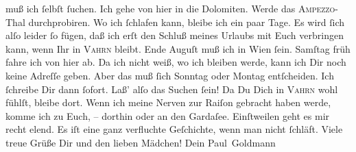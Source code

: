 \begin{ledgroupsized}[t]{13cm}
               muß ich ſelbſt ſuchen. Ich gehe von hier in die Dolomiten. Werde das \textsc{Ampezzo}-Thal durchprobiren. Wo ich ſchlafen kann,
               bleibe ich ein paar Tage. Es wird ſich alſo leider ſo fügen, {\pb}daß ich erſt den Schluß meines Urlaubs mit Euch verbringen kann, wenn Ihr
               in \textsc{Vahrn} bleibt.  Ende Auguſt muß ich in Wien ſein. Samſtag{ }früh fahre ich von hier ab. Da ich nicht weiß, wo ich bleiben werde,
               kann ich Dir noch keine Adreſſe  geben. Aber das muß
               ſich Sonntag oder Montag entſcheiden. Ich ſchreibe Dir dann ſofort. Laß’ alſo das Suchen
               ſein! Da Du Dich in \textsc{Vahrn} wohl fühlſt, bleibe dort. Wenn ich meine Nerven zur Raiſon gebracht haben
               werde, komme ich zu Euch, –
                  dorthin oder an den Gardaſee. Einſtweilen geht es mir recht elend.
               Es iſt eine ganz verfluchte Geſchichte, wenn man nicht ſchläft. Viele treue Grüße Dir
               und den lieben Mädchen!\pend
           \pstart Dein \spacefill\mbox{Paul Goldmann}\pend{}
         
         \endnumbering{}\end{ledgroupsized}  \newcommand{\dateiname}{L03076}\newcommand{\titel}{Paul Goldmann an Arthur Schnitzler, 1. 8. [1901]}\newcommand{\editorInnen}{Martin Anton Müller und Laura Untner}
      